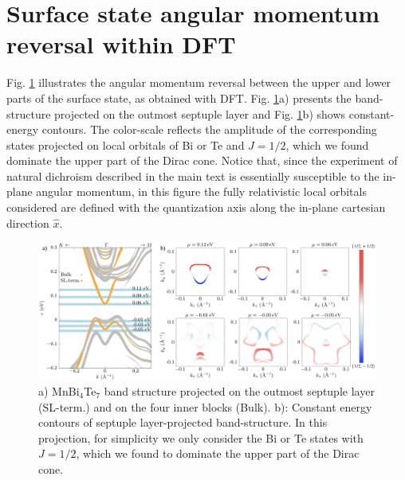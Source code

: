 \documentclass[showpacs, preprintnumbers, pra, superscriptaddress, floatfix, onecolumn, longbibliography]{revtex4-1}
\begin{document}
\section{Surface state angular momentum reversal within DFT}
Fig. \ref{dft_sl} illustrates the angular momentum reversal between the upper and lower parts of the surface state, as obtained with DFT. 
Fig. \ref{dft_sl}a) presents the band-structure projected on the outmost septuple layer and Fig. \ref{dft_sl}b) shows constant-energy contours. The color-scale reflects the amplitude of the corresponding states projected on local orbitals of Bi or Te and $J=1/2$, which we found dominate the upper part of the Dirac cone.
Notice that, since the experiment of natural dichroism described in the main text is essentially susceptible to the in-plane angular momentum, in this figure the fully relativistic local orbitals considered are defined with the quantization axis along the in-plane cartesian direction $\hat{x}$.
\begin{figure}[h!]
 \centering
 \includegraphics[width=18 cm]{sl.png}
	\caption{a) MnBi$_4$Te$_7$ band structure projected on the outmost septuple layer (SL-term.) and on the four inner blocks (Bulk). 
	b): Constant energy contours of septuple layer-projected band-structure. In this projection, for simplicity we only consider the Bi or Te states with $J=1/2$, which we found to dominate the upper part of the Dirac cone.
	}
	\label{dft_sl}
\end{figure}



\end{document}
